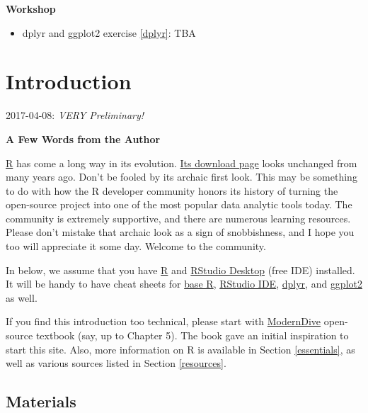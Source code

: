 \documentclass[]{book}
\providecommand{\tightlist}{%
  \setlength{\itemsep}{0pt}\setlength{\parskip}{0pt}}
\theoremstyle{definition}
\theoremstyle{definition}
\theoremstyle{remark}
\begin{document}
\textbf{Workshop}

\begin{itemize}
\tightlist
\item
  dplyr and ggplot2 exercise \ref{dplyr}: TBA
\end{itemize}

\chapter{Introduction}\label{intro}

2017-04-08: {\emph{VERY Preliminary!}}

\textbf{A Few Words from the Author}

\href{https://www.r-project.org/}{R} has come a long way in its
evolution. \href{https://cran.r-project.org/}{Its download page} looks
unchanged from many years ago. Don't be fooled by its archaic first
look. This may be something to do with how the R developer community
honors its history of turning the open-source project into one of the
most popular data analytic tools today. The community is extremely
supportive, and there are numerous learning resources. Please don't
mistake that archaic look as a sign of snobbishness, and I hope you too
will appreciate it some day. Welcome to the community.

In below, we assume that you have \href{https://cran.r-project.org/}{R}
and \href{https://www.rstudio.com/products/rstudio/download/}{RStudio
Desktop} (free IDE) installed. It will be handy to have cheat sheets for
\href{http://github.com/rstudio/cheatsheets/raw/master/source/pdfs/base-r.pdf}{base
R},
\href{https://www.rstudio.com/wp-content/uploads/2016/01/rstudio-IDE-cheatsheet.pdf}{RStudio
IDE},
\href{https://github.com/rstudio/cheatsheets/raw/master/source/pdfs/data-transformation-cheatsheet.pdf}{dplyr},
and
\href{https://www.rstudio.com/wp-content/uploads/2016/11/ggplot2-cheatsheet-2.1.pdf}{ggplot2}
as well.

If you find this introduction too technical, please start with
\href{https://ismayc.github.io/moderndiver-book/4-viz.html}{ModernDive}
open-source textbook (say, up to Chapter 5). The book gave an initial
inspiration to start this site. Also, more information on R is available
in Section \ref{essentials}, as well as various sources listed in
Section \ref{resources}.

\section{Materials}\label{materials}
\end{document}
